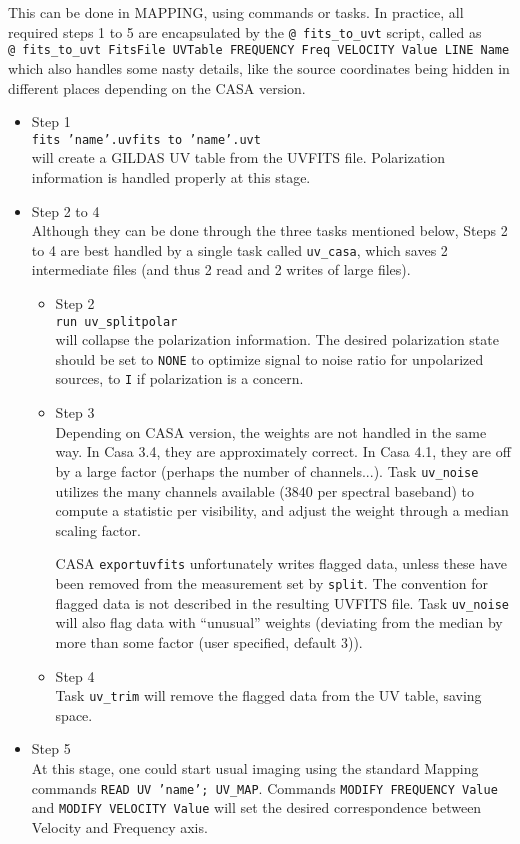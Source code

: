 \documentclass[11pt]{article}
\begin{document}
This can be done in MAPPING, using commands or tasks.
In practice, all required steps 1 to 5 are encapsulated by
the \texttt{@ fits\_to\_uvt} script, called as\\
\texttt{@ fits\_to\_uvt FitsFile UVTable FREQUENCY Freq VELOCITY Value LINE Name}\\
which also handles some nasty details, like the source coordinates
being hidden in different places depending on the CASA version.

\begin{itemize}
\item Step 1 \\
\texttt{fits 'name'.uvfits to 'name'.uvt}\\
will create a GILDAS UV table from the UVFITS file.
Polarization information is handled properly at this stage.
\item Step 2 to 4\\
Although they can be done through the three tasks
mentioned below, Steps 2 to 4 are best handled by a single
task called \texttt{uv\_casa}, which saves 2 intermediate files
(and thus 2 read and 2 writes of large files).
\begin{itemize}
\item Step 2 \\
\texttt{run uv\_splitpolar} \\
will collapse the polarization information. The desired 
polarization state should be set to \texttt{NONE} to optimize signal to noise
ratio for unpolarized sources, to \texttt{I} if polarization
is a concern.
\item Step 3 \\
Depending on CASA version, the weights are not handled
in the same way. In Casa 3.4, they are approximately correct.
In Casa 4.1, they are off by a large factor (perhaps the
number of channels...).  Task \texttt{uv\_noise}
utilizes the many channels available (3840 per spectral baseband)
to compute a statistic per visibility, and adjust the weight
through a median scaling factor. 

CASA \texttt{exportuvfits} unfortunately writes flagged data, 
unless these have been removed from the measurement set by
\texttt{split}. The convention for flagged data is not
described in the resulting UVFITS file. Task \texttt{uv\_noise} 
will also flag data with ``unusual'' weights (deviating from the median
by more than some factor (user specified, default 3)).\\
\item Step 4 \\
Task \texttt{uv\_trim} will remove the flagged data from the
UV table, saving space.
\end{itemize}
\item Step 5\\
At this stage, one could start usual imaging using the
standard Mapping commands \texttt{READ UV 'name'; UV\_MAP}. 
Commands \texttt{MODIFY FREQUENCY Value} and \texttt{MODIFY
VELOCITY Value} will set the desired correspondence  between
Velocity and Frequency axis.
\end{itemize}
\end{document}
